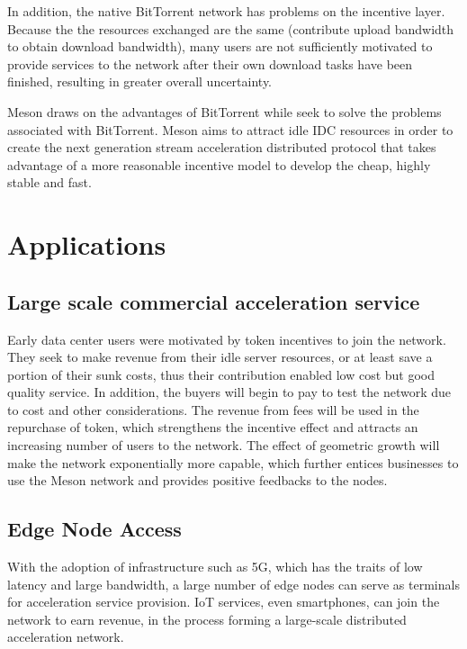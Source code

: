 \documentclass[12pt, a4paper, unicode]{report}
\begin{document}
    In addition, the native BitTorrent network has problems on the incentive layer. Because the the resources exchanged are the same (contribute upload bandwidth to obtain download bandwidth), many users are not sufficiently motivated to provide services to the network after their own download tasks have been finished, resulting in greater overall uncertainty.
    
   Meson draws on the advantages of BitTorrent while seek to solve the problems associated with BitTorrent. Meson aims to attract idle IDC resources in order to create the next generation stream acceleration distributed protocol that takes advantage of a more reasonable incentive model to develop the cheap, highly stable and fast.
   
    \chapter{Applications}
    \section{Large scale commercial acceleration service}
    Early data center users were motivated by token incentives to join the network. They seek to make revenue from their idle server resources, or at least save a portion of their sunk costs, thus their contribution enabled low cost but good quality service. In addition, the buyers will begin to pay to test the network due to cost and other considerations. The revenue from fees will be used in the repurchase of token, which strengthens the incentive effect and attracts an increasing number of users to the network. The effect of geometric growth will make the network exponentially more capable, which further entices businesses to use the Meson network and provides positive feedbacks to the nodes.
    
    \section{Edge Node Access}
    With the adoption of infrastructure such as 5G, which has the traits of low latency and large bandwidth, a large number of edge nodes can serve as terminals for acceleration service provision. IoT services, even smartphones, can join the network to earn revenue, in the process forming a large-scale distributed acceleration network.
\end{document}
